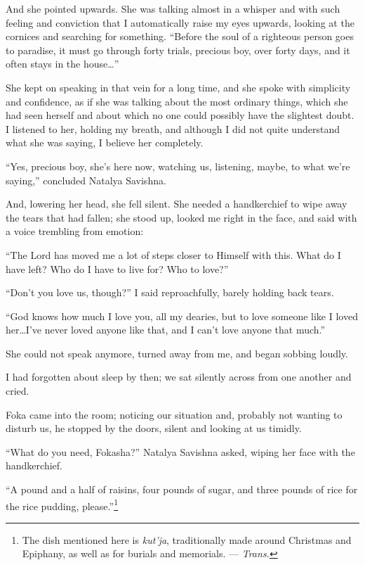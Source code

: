 And she pointed upwards. She was talking almost in a whisper and with such feeling and conviction that I automatically raise my eyes upwards, looking at the cornices and searching for something. ``Before the soul of a righteous person goes to paradise, it must go through forty trials, precious boy, over forty days, and it often stays in the house\ldots{}'' %

She kept on speaking in that vein for a long time, and she spoke with simplicity and confidence, as if she was talking about the most ordinary things, which she had seen herself and about which no one could possibly have the slightest doubt. I listened to her, holding my breath, and although I did not quite understand what she was saying, I believe her completely.

``Yes, precious boy, she's here now, watching us, listening, maybe, to what we're saying,'' concluded Natalya Savishna. %

And, lowering her head, she fell silent. She needed a handkerchief to wipe away the tears that had fallen; she stood up, looked me right in the face, and said with a voice trembling from emotion:

``The Lord has moved me a lot of steps closer to Himself with this. What do I have left? Who do I have to live for? Who to love?''  %

``Don't you love us, though?'' I said reproachfully, barely holding back tears. %

``God knows how much I love you, all my dearies, but to love someone like I loved her\ldots{}I've never loved anyone like that, and I can't love anyone that much.'' %

She could not speak anymore, turned away from me, and began sobbing loudly.

I had forgotten about sleep by then; we sat silently across from one another and cried.

Foka came into the room; noticing our situation and, probably not wanting to disturb us, he stopped by the doors, silent and looking at us timidly.

``What do you need, Fokasha?'' Natalya Savishna asked, wiping her face with the handkerchief. %

``A pound and a half of raisins, four pounds of sugar, and three pounds of rice for the rice pudding, please.''\footnote{The dish mentioned here is \textit{kut'ja}, traditionally made around Christmas and Epiphany, as well as for burials and memorials. --- \textit{Trans.}} %

